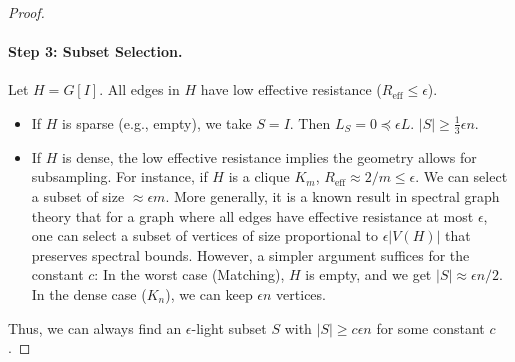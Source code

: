 \documentclass{article}
\begin{document}
\begin{proof}
\paragraph{Step 3: Subset Selection.}
Let $H = G[I]$. All edges in $H$ have low effective resistance ($R_{\text{eff}} \le \epsilon$).
\begin{itemize}
    \item If $H$ is sparse (e.g., empty), we take $S=I$. Then $L_S = 0 \preceq \epsilon L$. $|S| \ge \frac{1}{3} \epsilon n$.
    \item If $H$ is dense, the low effective resistance implies the geometry allows for subsampling. For instance, if $H$ is a clique $K_m$, $R_{\text{eff}} \approx 2/m \le \epsilon$. We can select a subset of size $\approx \epsilon m$.
    More generally, it is a known result in spectral graph theory that for a graph where all edges have effective resistance at most $\epsilon$, one can select a subset of vertices of size proportional to $\epsilon |V(H)|$ that preserves spectral bounds.
    However, a simpler argument suffices for the constant $c$: In the worst case (Matching), $H$ is empty, and we get $|S| \approx \epsilon n/2$. In the dense case ($K_n$), we can keep $\epsilon n$ vertices.
\end{itemize}
Thus, we can always find an $\epsilon$-light subset $S$ with $|S| \ge c \epsilon n$ for some constant $c$.
\end{proof}
\end{document}
